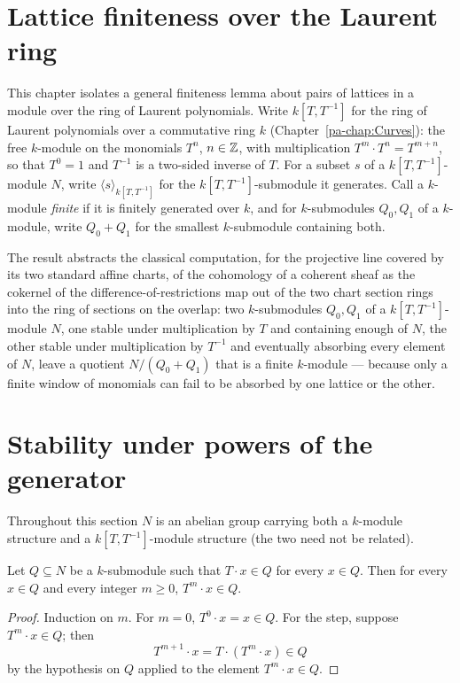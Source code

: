 \section{Lattice finiteness over the Laurent ring}
\label{pa-chap:Algebra}

This chapter isolates a general finiteness lemma about pairs of lattices in a module over
the ring of Laurent polynomials. Write \(k[T, T^{-1}]\) for the ring of Laurent polynomials
over a commutative ring \(k\) (Chapter~\ref{pa-chap:Curves}): the free \(k\)-module on the
monomials \(T^n\), \(n \in \mathbb{Z}\), with multiplication \(T^m \cdot T^n = T^{m+n}\), so that
\(T^0 = 1\) and \(T^{-1}\) is a two-sided inverse of \(T\). For a subset \(s\) of a
\(k[T,T^{-1}]\)-module \(N\), write \(\langle s \rangle_{k[T,T^{-1}]}\) for the
\(k[T,T^{-1}]\)-submodule it generates. Call a \(k\)-module \emph{finite} if it is finitely
generated over \(k\), and for \(k\)-submodules \(Q_0, Q_1\) of a \(k\)-module, write
\(Q_0 + Q_1\) for the smallest \(k\)-submodule containing both.

The result abstracts the classical computation, for the projective line covered by its two
standard affine charts, of the cohomology of a coherent sheaf as the cokernel of the
difference-of-restrictions map out of the two chart section rings into the ring of sections
on the overlap: two \(k\)-submodules \(Q_0, Q_1\) of a \(k[T,T^{-1}]\)-module \(N\), one
stable under multiplication by \(T\) and containing enough of \(N\), the other stable under
multiplication by \(T^{-1}\) and eventually absorbing every element of \(N\), leave a quotient
\(N / (Q_0 + Q_1)\) that is a finite \(k\)-module — because only a finite window of monomials
can fail to be absorbed by one lattice or the other.

\section{Stability under powers of the generator}

Throughout this section \(N\) is an abelian group carrying both a \(k\)-module structure and a
\(k[T,T^{-1}]\)-module structure (the two need not be related).

\begin{lemma}
  \label{pa-lem:T_pow_stable}
  \leanok

  Let \(Q \subseteq N\) be a \(k\)-submodule such that \(T \cdot x \in Q\) for every
  \(x \in Q\). Then for every \(x \in Q\) and every integer \(m \ge 0\), \(T^m \cdot x \in Q\).
\end{lemma}
\begin{proof}
  \leanok
  Induction on \(m\). For \(m = 0\), \(T^0 \cdot x = x \in Q\). For the step, suppose
  \(T^m \cdot x \in Q\); then
  \[
    T^{m+1} \cdot x = T \cdot (T^m \cdot x) \in Q
  \]
  by the hypothesis on \(Q\) applied to the element \(T^m \cdot x \in Q\).
\end{proof}

